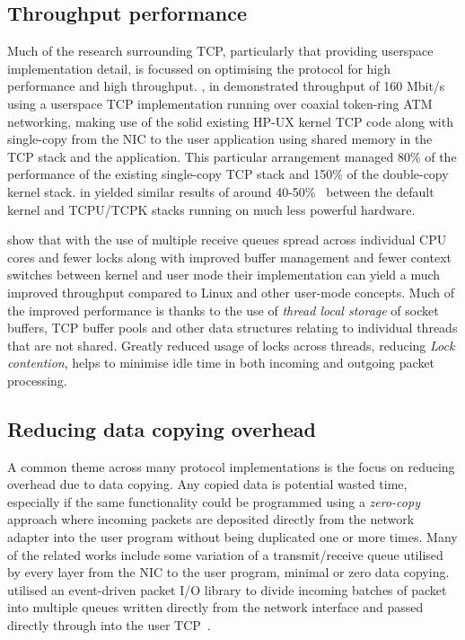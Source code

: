 \documentclass[11pt,a4paper,british]{bhamarticle}
\begin{document}
\subsection{Throughput performance}
Much of the research surrounding TCP, particularly that providing userspace implementation detail, is focussed on optimising the protocol for high performance and high throughput. \citeauthor{edwards1995experiences}, in \citeyear{edwards1995experiences} demonstrated throughput of 160 Mbit/s using a userspace TCP implementation running over coaxial token-ring ATM networking, making use of the solid existing HP-UX kernel TCP code along with single-copy from the NIC to the user application using shared memory in the TCP stack and the application. This particular arrangement managed 80\% of the performance of the existing single-copy TCP stack and 150\% of the double-copy kernel stack. \citeauthor{braun:inria-00074040} in \citeyear{braun:inria-00074040} yielded similar results of around 40-50\%~\cite[5]{braun:inria-00074040} between the default kernel and TCPU/TCPK stacks running on much less powerful hardware.

\citeauthor{jeong2014mtcp} show that with the use of multiple receive queues spread across individual CPU cores and fewer locks along with improved buffer management and fewer context switches between kernel and user mode their implementation can yield a much improved throughput compared to Linux and other user-mode concepts. Much of the improved performance is thanks to the use of \textit{thread local storage} of socket buffers, TCP buffer pools and other data structures relating to individual threads that are not shared. Greatly reduced usage of locks across threads, reducing \textit{Lock contention}, helps to minimise idle time in both incoming and outgoing packet processing.

\subsection{Reducing data copying overhead}
A common theme across many protocol implementations is the focus on reducing overhead due to data copying. Any copied data is potential wasted time, especially if the same functionality could be programmed using a \textit{zero-copy} approach where incoming packets are deposited directly from the network adapter into the user program without being duplicated one or more times. Many of the related works include some variation of a transmit/receive queue utilised by every layer from the NIC to the user program, minimal or zero data copying. \citeauthor{jeong2014mtcp} utilised an event-driven packet I/O library to divide incoming batches of packet into multiple queues written directly from the network interface and passed directly through into the user TCP~\cite[3.1]{jeong2014mtcp}.
\end{document}
